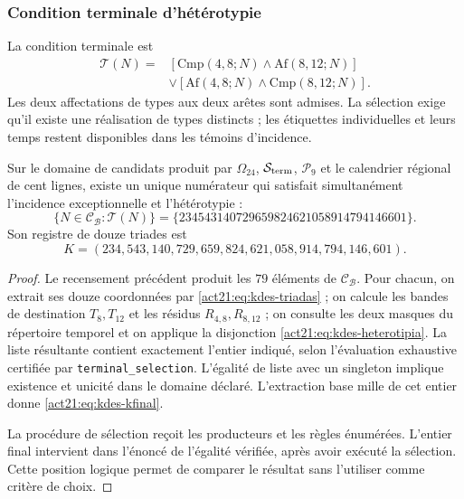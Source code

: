 \subsubsection{Condition terminale d'hétérotypie}

La condition terminale est
\begin{equation}
 \begin{split}
 \mathcal T(N)={}&
 [\mathrm{Cmp}(4,8;N)\wedge\mathrm{Af}(8,12;N)]\\
 &\vee[\mathrm{Af}(4,8;N)\wedge\mathrm{Cmp}(8,12;N)].
 \end{split}
 \label{act21:eq:kdes-heterotipia}
\end{equation}
Les deux affectations de types aux deux arêtes sont admises. La
sélection exige qu'il existe une réalisation de types distincts ; les
étiquettes individuelles et leurs temps restent disponibles dans les
témoins d'incidence.

\begin{theorem}
Sur le domaine de candidats produit par
$\Omega_{24}$, $\mathcal S_{\rm term}$, $\mathcal P_9$ et le calendrier
régional de cent lignes, existe un unique numérateur qui satisfait
simultanément l'incidence exceptionnelle et l'hétérotypie :
\[
 \{N\in\mathcal C_{\mathcal B}:\mathcal T(N)\}
 =\{234543140729659824621058914794146601\}.
\]
Son registre de douze triades est
\begin{equation}
 K=(234,543,140,729,659,824,621,058,914,794,146,601).
 \label{act21:eq:kdes-kfinal}
\end{equation}
\end{theorem}
\begin{proof}
Le recensement précédent produit les $79$ éléments de
$\mathcal C_{\mathcal B}$. Pour chacun, on extrait ses douze
coordonnées par \eqref{act21:eq:kdes-triadas} ; on calcule les bandes de
destination $T_8,T_{12}$ et les résidus $R_{4,8},R_{8,12}$ ; on consulte
les deux masques du répertoire temporel et on applique la disjonction
\eqref{act21:eq:kdes-heterotipia}. La liste résultante contient exactement
l'entier indiqué, selon l'évaluation exhaustive certifiée par
\texttt{terminal\_selection}. L'égalité de liste avec un singleton
implique existence et unicité dans le domaine déclaré. L'extraction
base mille de cet entier donne \eqref{act21:eq:kdes-kfinal}.

La procédure de sélection reçoit les producteurs et les règles énumérées. L'entier final intervient dans l'énoncé de l'égalité vérifiée, après avoir exécuté la sélection. Cette position logique permet de comparer le résultat sans l'utiliser comme critère de choix.
\end{proof}

